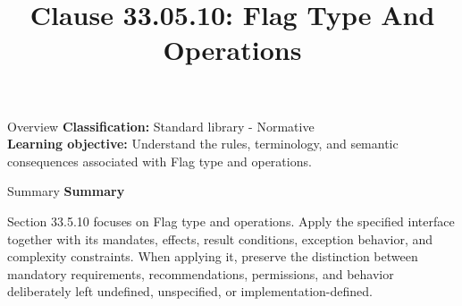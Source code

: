 \documentclass[10pt,letterpaper]{article}
\title{Clause 33.05.10: Flag Type And Operations}
\author{}
\date{}
\begin{document}
\maketitle
\begin{CornellOverviewBox}{Overview}
\textbf{Classification:} Standard library - Normative\\[2pt]
\textbf{Learning objective:} Understand the rules, terminology, and semantic consequences associated with Flag type and operations.
\end{CornellOverviewBox}\begin{CornellSummaryBox}{Summary}
{\sffamily\bfseries\color{Accent} Summary}\par\vspace{3pt}Section 33.5.10 focuses on Flag type and operations. Apply the specified interface together with its mandates, effects, result conditions, exception behavior, and complexity constraints. When applying it, preserve the distinction between mandatory requirements, recommendations, permissions, and behavior deliberately left undefined, unspecified, or implementation-defined.
\end{CornellSummaryBox}
\end{document}
